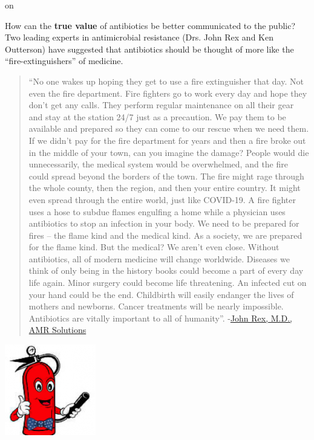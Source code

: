 \documentclass[
]{book}
\begin{document}
on

How can the \textbf{true value} of antibiotics be better communicated to the public? Two leading experts in antimicrobial resistance (Drs. John Rex and Ken Outterson) have suggested that antibiotics should be thought of more like the ``fire-extinguishers'' of medicine.

\begin{quote}
``No one wakes up hoping they get to use a fire extinguisher that day. Not even the fire department. Fire fighters go to work every day and hope they don't get any calls. They perform regular maintenance on all their gear and stay at the station 24/7 just as a precaution. We pay them to be available and prepared so they can come to our rescue when we need them. If we didn't pay for the fire department for years and then a fire broke out in the middle of your town, can you imagine the damage? People would die unnecessarily, the medical system would be overwhelmed, and the fire could spread beyond the borders of the town. The fire might rage through the whole county, then the region, and then your entire country. It might even spread through the entire world, just like COVID-19. A fire fighter uses a hose to subdue flames engulfing a home while a physician uses antibiotics to stop an infection in your body. We need to be prepared for fires -- the flame kind and the medical kind. As a society, we are prepared for the flame kind. But the medical? We aren't even close. Without antibiotics, all of modern medicine will change worldwide. Diseases we think of only being in the history books could become a part of every day life again. Minor surgery could become life threatening. An infected cut on your hand could be the end. Childbirth will easily endanger the lives of mothers and newborns. Cancer treatments will be nearly impossible. Antibiotics are vitally important to all of humanity''. -\href{https://amr.solutions/fire-extinguishers-of-medicine/}{John Rex, M.D., AMR Solutions}
\end{quote}

\includegraphics{images/fire extinguisher-01.png}
\end{document}
